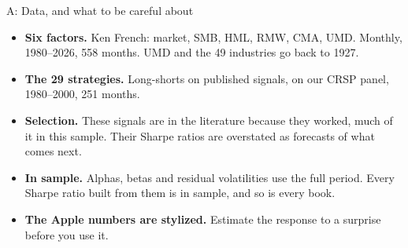 \documentclass[aspectratio=169,10pt]{beamer}
\begin{document}
\begin{frame}{A: Data, and what to be careful about}
\begin{itemize}
\item \textbf{Six factors.} Ken French: market, SMB, HML, RMW, CMA, UMD. Monthly, 1980--2026, 558 months. UMD and the 49 industries go back to 1927.
\vskip 8pt
\item \textbf{The 29 strategies.} Long-shorts on published signals, on our CRSP panel, 1980--2000, 251 months.
\vskip 8pt
\item \textbf{Selection.} These signals are in the literature because they worked, much of it in this sample. Their Sharpe ratios are overstated as forecasts of what comes next.
\vskip 8pt
\item \textbf{In sample.} Alphas, betas and residual volatilities use the full period. Every Sharpe ratio built from them is in sample, and so is every book.
\vskip 8pt
\item \textbf{The Apple numbers are stylized.} Estimate the response to a surprise before you use it.
\end{itemize}
\end{frame}
\end{document}

